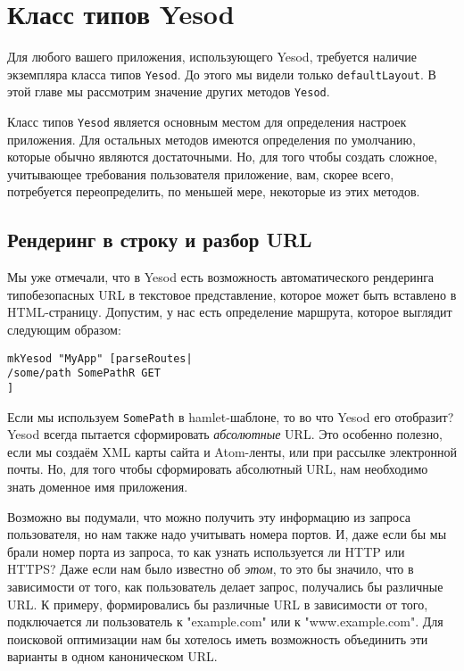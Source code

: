 \chapter {Класс типов Yesod}\label{ch:yesod-typeclass}

Для любого вашего приложения, использующего Yesod, требуется наличие экземпляра класса типов \lstinline!Yesod!. До этого мы видели только \lstinline!defaultLayout!. В этой главе мы рассмотрим значение других методов \lstinline!Yesod!.

Класс типов \lstinline!Yesod! является основным местом для определения настроек приложения. Для остальных методов имеются определения по умолчанию, которые обычно являются достаточными. Но, для того чтобы создать сложное, учитывающее требования пользователя приложение, вам, скорее всего, потребуется переопределить, по меньшей мере, некоторые из этих методов.

\section {Рендеринг в строку и разбор URL}

Мы уже отмечали, что в Yesod есть возможность автоматического рендеринга типобезопасных URL в текстовое представление, которое может быть вставлено в HTML-страницу. Допустим, у нас есть определение маршрута, которое выглядит следующим образом:

\begin{lstlisting}
mkYesod "MyApp" [parseRoutes|
/some/path SomePathR GET
]
\end{lstlisting}

Если мы используем \lstinline!SomePath! в hamlet-шаблоне, то во что Yesod его отобразит? Yesod всегда пытается сформировать \emph{абсолютные} URL. Это особенно полезно, если мы создаём XML карты сайта и Atom-ленты, или при рассылке электронной почты. Но, для того чтобы сформировать абсолютный URL, нам необходимо знать доменное имя приложения.

Возможно вы подумали, что можно получить эту информацию из запроса пользователя, но нам также надо учитывать номера портов. И, даже если бы мы брали номер порта из запроса, то как узнать используется ли HTTP или HTTPS? Даже если нам было известно об \emph{этом}, то это бы значило, что в зависимости от того, как пользователь делает запрос, получались бы различные URL. К примеру, формировались бы различные URL в зависимости от того, подключается ли пользователь к "example.com" или к "www.example.com". Для поисковой оптимизации нам бы хотелось иметь возможность объединить эти варианты в одном каноническом URL.

